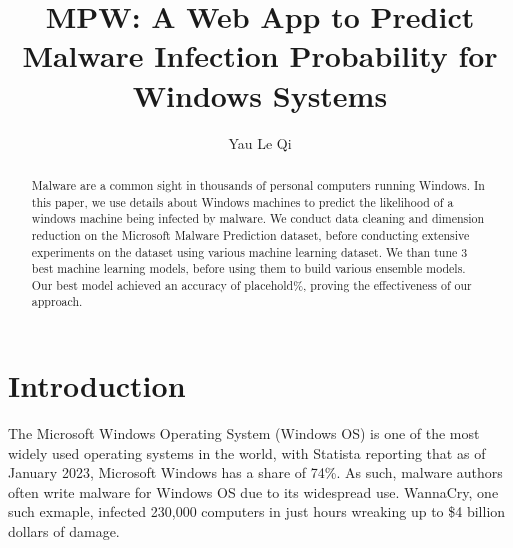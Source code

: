 \documentclass[runningheads]{llncs}
\begin{document}
%
\title{MPW: A Web App to Predict Malware Infection Probability for Windows Systems}
%
%
\author{Yau Le Qi}%
%
%
%
\maketitle              %
%
\begin{abstract}
Malware are a common sight in thousands of personal computers running Windows. In this paper, we use details about Windows machines to predict the likelihood of a windows machine being infected by malware. We conduct data cleaning and dimension reduction on the Microsoft Malware Prediction dataset, before conducting extensive experiments on the dataset using various machine learning dataset. We than tune 3 best machine learning models, before using them to build various ensemble models. Our best model achieved an accuracy of placehold\%, proving the effectiveness of our approach.

\end{abstract}
%
%
%
\section{Introduction}
The Microsoft Windows Operating System (Windows OS) is one of the most widely used operating systems in the world, with Statista reporting that as of January 2023, Microsoft Windows has a share of 74\%. As such, malware authors often write malware for Windows OS due to its widespread use. WannaCry, one such exmaple, infected 230,000 computers in just hours wreaking up to \$4 billion dollars of damage.\par
\end{document}
